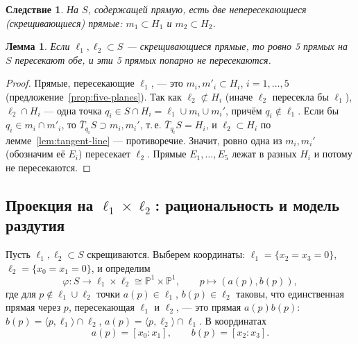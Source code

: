 \documentclass[11pt,a4paper]{article}
\theoremstyle{plain}
\newtheorem{lemma}[theorem]{Лемма}
\newtheorem{corollary}[theorem]{Следствие}
\theoremstyle{definition}
\theoremstyle{remark}
\newcommand{\PP}{\mathbb{P}}
\begin{document}
\begin{corollary}\label{cor:skew}
На $S$, содержащей прямую, есть две непересекающиеся (скрещивающиеся) прямые: $m_1\subset H_1$ и $m_2\subset H_2$.
\end{corollary}

\begin{lemma}\label{lem:five-common}
Если $\ell_1,\ell_2\subset S$ --- скрещивающиеся прямые, то ровно 5 прямых на $S$ пересекают обе, и эти 5 прямых
попарно не пересекаются.
\end{lemma}
\begin{proof}
Прямые, пересекающие $\ell_1$, --- это $m_i,m'_i\subset H_i$, $i=1,\dots,5$ (предложение~\ref{prop:five-planes}).
Так как $\ell_2\not\subset H_i$ (иначе $\ell_2$ пересекла бы $\ell_1$), $\ell_2\cap H_i$ --- одна точка $q_i\in
S\cap H_i=\ell_1\cup m_i\cup m_i'$, причём $q_i\notin\ell_1$. Если бы $q_i\in m_i\cap m'_i$, то
$\overline T_{q_i}S\supset m_i,m_i'$, т.\,е. $\overline T_{q_i}S=H_i$, и $\ell_2\subset H_i$ по
лемме~\ref{lem:tangent-line} --- противоречие. Значит, ровно одна из $m_i,m_i'$ (обозначим её $E_i$)
пересекает $\ell_2$. Прямые $E_1,\dots,E_5$ лежат в разных $H_i$ и потому не пересекаются.
\end{proof}

\subsection{Проекция на $\ell_1\times\ell_2$: рациональность и модель раздутия}

Пусть $\ell_1,\ell_2\subset S$ скрещиваются. Выберем координаты:
$\ell_1=\{x_2=x_3=0\}$, $\ell_2=\{x_0=x_1=0\}$, и определим
\[
\varphi\colon S\to\ell_1\times\ell_2\cong\PP^1\times\PP^1,\qquad p\mapsto(a(p),b(p)),
\]
где для $p\notin\ell_1\cup\ell_2$ точки $a(p)\in\ell_1$, $b(p)\in\ell_2$ таковы, что единственная прямая через $p$,
пересекающая $\ell_1$ и $\ell_2$, --- это прямая $a(p)b(p)$: $b(p)=\langle p,\ell_1\rangle\cap\ell_2$,
$a(p)=\langle p,\ell_2\rangle\cap\ell_1$. В координатах
\[
a(p)=[x_0:x_1],\qquad b(p)=[x_2:x_3].
\]
\end{document}
